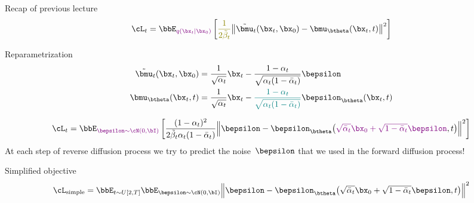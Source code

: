 \begin{frame}{Recap of previous lecture}
	\vspace{-0.3cm}
	\[
		\cL_t = \bbE_{\color{violet}q(\bx_t | \bx_0)} \left[ {\color{olive}\frac{1}{2\tilde{\beta}_t}} \bigl\| \tilde{\bmu}_t(\bx_t, \bx_0) - \bmu_{\btheta}(\bx_t, t) \bigr\|^2  \right]
	\]
	\vspace{-0.3cm}
	\begin{block}{Reparametrization}
		\vspace{-0.7cm}
		\begin{align*}
			\tilde{\bmu}_t(\bx_t, \bx_0) &= \frac{1}{\sqrt{\alpha_t}} \bx_t - \frac{1 - \alpha_t}{\sqrt{\alpha_t (1 - \bar{\alpha}_t)}} \bepsilon \\
			\bmu_{\btheta}(\bx_t, t) &= \frac{1}{\sqrt{\alpha_t}} \bx_t - {\color{teal}\frac{1 - \alpha_t}{\sqrt{\alpha_t (1 - \bar{\alpha}_t)}}} \bepsilon_{\btheta}(\bx_t, t)
		\end{align*}
		\vspace{-0.7cm}
	\end{block}
	\vspace{-0.2cm}
	\[
		\cL_t  =	 \bbE_{\color{violet}\bepsilon \sim \cN(0, \bI)} \left[ \frac{(1 - \alpha_t)^2}{2\tilde{\beta}_t \alpha_t (1 - \bar{\alpha}_t)} \Bigl\| \bepsilon - \bepsilon_{\btheta}\bigl( {\color{violet}\sqrt{\bar{\alpha}_t} \bx_0 + \sqrt{1 - \bar{\alpha}_t} \bepsilon}, t\bigr) \Bigr\|^2 \right]
	\]
	At each step of reverse diffusion process we try to predict the noise~$\bepsilon$ that we used in the forward diffusion process!
	\begin{block}{Simplified objective}
		\vspace{-0.7cm}
		\[
			 \cL_{\text{simple}} = \bbE_{t \sim U[2, T]} \bbE_{\bepsilon \sim \cN(0, \bI)} \Bigl\| \bepsilon - \bepsilon_{\btheta}\bigl( \sqrt{\bar{\alpha}_t} \bx_0 + \sqrt{1 - \bar{\alpha}_t} \bepsilon, t\bigr) \Bigr\|^2 
		\]
	\end{block}
	\end{frame}
